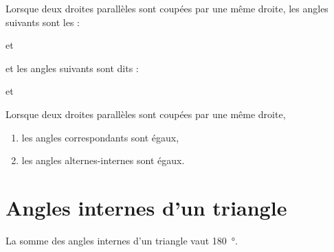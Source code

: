 

\begin{definition}
    Lorsque deux droites parallèles sont coupées par une même droite, les angles suivants sont les  :

\begin{center}
   
   \hfill et\hfill
   
\end{center}

et les angles suivants sont dits  :

\begin{center}
   
   \hfill et\hfill
   
\end{center}

\end{definition}

\begin{propriete}
    Lorsque deux droites parallèles sont coupées par une même droite,
    \begin{enumerate}
        \item
            les angles correspondants sont égaux,
        \item
            les angles alternes-internes sont égaux.
    \end{enumerate}
\end{propriete}

\section{Angles internes d'un triangle}




\begin{theorem}
    La somme des angles internes d'un triangle vaut \SI{180}{\degree}.
\end{theorem}

